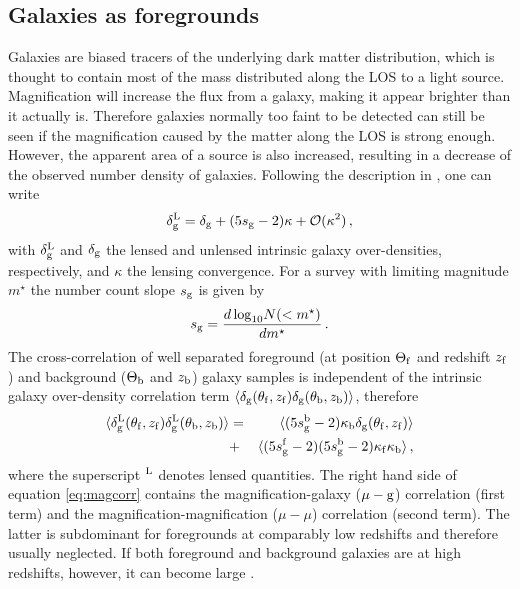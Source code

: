 \documentclass[useAMS,usenatbib]{mnras}
\newcommand{\be}{\begin{equation}}
\newcommand{\ee}{\end{equation}}
\newcommand{\bea}{\begin{eqnarray}}
\newcommand{\eea}{\end{eqnarray}}
\begin{document}
\subsection{Galaxies as foregrounds}
\label{ssec:maggal}
Galaxies are biased tracers of the underlying dark matter distribution, which is thought to contain most of the mass distributed along the LOS to a light source. Magnification will increase the flux from a galaxy, making it appear brighter than it actually is. Therefore galaxies normally too faint to be detected can still be seen if the magnification caused by the matter along the LOS is strong enough. However, the apparent area of a source is also increased, resulting in a decrease of the observed number density of galaxies. Following the description in \citep{2008PhRvD..78l3517Z}, one can write
\be
\delta^{\rm L}_{\rm g}=\delta_{\rm g}+(5s_{\rm g}-2)\kappa +\mathcal{O}(\kappa^2) \, ,
\ee with $\delta_{\rm g}^{\rm L}$ and $\delta_{\rm g}$ the lensed and unlensed intrinsic galaxy over-densities, respectively, and $\kappa$ the lensing convergence. For a survey with limiting magnitude $m^\star$ the number count slope $s_{\rm g}$ is given by
\be
\label{eq:sg}
s_{\rm g} = \frac{d{\rm \, log}_{10}N(< m^\star)}{dm^\star} \, .
\ee
The cross-correlation of well separated foreground (at position $\Theta_{\rm f}$ and redshift $z_{\rm f}$) and background ($\Theta_{\rm b}$ and $z_{\rm b}$) galaxy samples is independent of the intrinsic galaxy over-density correlation term $\langle \delta_{\rm g}(\theta_{\rm f},z_{\rm f}) \delta_{\rm g}(\theta_{\rm b},z_{\rm b}) \rangle$, therefore
\bea
\label{eq:magcorr}
\langle \delta^{\rm L}_{\rm g}(\theta_{\rm f},z_{\rm f}) \delta^{\rm L}_{\rm g}(\theta_{\rm b},z_{\rm b}) \rangle
&=& \langle(5s^{\rm b}_{\rm g}-2) \kappa_{\rm b}  \delta_{\rm g}(\theta_{\rm f},z_{\rm f}) \rangle \nonumber \\
&+& \langle(5s^{\rm f}_{\rm g}-2)(5s^{\rm b}_{\rm g}-2)  \kappa_{\rm f} \kappa_{\rm b} \rangle \, ,
\eea
where the superscript ${}^{\rm L}$ denotes lensed quantities. The right hand side of equation \ref{eq:magcorr} contains the magnification-galaxy ($\mu-\rm g$) correlation (first term) and the magnification-magnification ($\mu-\mu$) correlation (second term). The latter is subdominant for foregrounds at comparably low redshifts and therefore usually neglected. If both foreground and background galaxies are at high redshifts, however, it can become large \citep{2008PhRvD..78l3517Z}.
\end{document}
